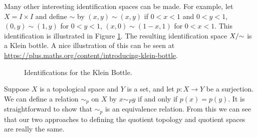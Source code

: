 \begin{comment}
	\item  All points in the interior of the square are identified only with themselves, but the boundaries points are all identified together as indicated at left in Figure \ref{F:Quotient_sphere}. So the boundary collapses to a point. Think of taking the square and pinching all of the sides together. What is left looks like a sphere, with the sides all identified with a single point on the sphere as shown at right in Figure \ref{F:Quotient_sphere}. %
\begin{figure}[h]
\begin{center}
\resizebox{!}{1.25in}{\texttt{[image: Quotient\_sphere\_1.png]}} \hspace{0.75in} \resizebox{!}{1.25in}{\texttt{[image: Quotient\_sphere\_2.png]}} 
\caption{A sphere as the identification space $X/\ssim$.} 
\label{F:Quotient_sphere}
\end{center}
\end{figure}

	\end{enumerate}
	
\ea

\end{comment}

Many other interesting identification spaces can be made. For example, let $X = I \times I$ and define $\sim$ by $(x, y) \sim (x,y)$ if $0 < x < 1$ and $0 < y < 1$, $(0, y) \sim (1, y)$ for $0 < y < 1$, $(x,0) \sim (1-x,1)$ for $0 < x < 1$. This identification is illustrated in Figure \ref{F:Klein_bottle}. The resulting identification space $X/\hspace{-1mm}\sim$ is a Klein bottle. A nice illustration of this can be seen at 
\url{https://plus.maths.org/content/introducing-klein-bottle}.
\begin{figure}[h]
\begin{center}
\caption{Identifications for the Klein Bottle.} 
\label{F:Klein_bottle}
\end{center}
\end{figure}


Suppose $X$ is a topological space and $Y$ is a set, and let $p: X \to Y$ be a surjection. We can define a relation $\sim_p$ on $X$ by $x \sim_P y$ if and only if $p(x) = p(y)$. It is straightforward to show that $\sim_p$ is an equivalence relation. From this we can see that our two approaches to defining the quotient topology and quotient spaces are really the same. 

